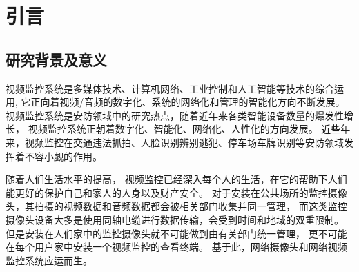 \chapter{引言}
\section{研究背景及意义}
视频监控系统是多媒体技术、计算机网络、工业控制和人工智能等技术的综合运用,
它正向着视频/音频的数字化、系统的网络化和管理的智能化方向不断发展\cite{宋磊2003视频监控系统概述}。
视频监控系统是安防领域中的研究热点，随着近年来各类智能设备数量的爆发性增长，
视频监控系统正朝着数字化、智能化、网络化、人性化的方向发展\cite{索郎邓珠0实时视频监控系统的设计与实现}。
近些年来，视频监控在交通违法抓拍、人脸识别辨别逃犯、停车场车牌识别等安防领域发挥着不容小觑的作用。

随着人们生活水平的提高，
视频监控已经深入每个人的生活，在它的帮助下人们能更好的保护自己和家人的人身以及财产安全\cite{葛林0基于}。
对于安装在公共场所的监控摄像头，其拍摄的视频数据和音频数据都会被相关部门收集并同一管理，
而这类监控摄像头设备大多是使用同轴电缆进行数据传输，会受到时间和地域的双重限制。
但是安装在人们家中的监控摄像头就不可能做到由有关部门统一管理，
更不可能在每个用户家中安装一个视频监控的查看终端。
基于此，网络摄像头和网络视频监控系统应运而生。




